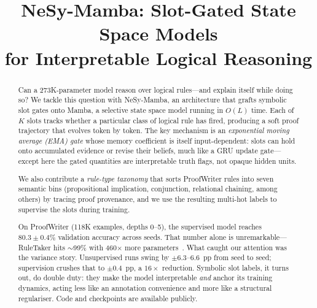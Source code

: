 \documentclass[conference]{IEEEtran}
\DeclareRobustCommand{\model}{NeSy-Mamba}
\begin{document}
\title{NeSy-Mamba: Slot-Gated State Space Models\\for Interpretable Logical Reasoning}

\author{
}

\maketitle

\begin{abstract}
Can a 273K-parameter model reason over logical rules---and explain
itself while doing so? We tackle this question with \model{}, an
architecture that grafts symbolic slot gates onto Mamba, a selective
state space model running in $O(L)$ time. Each of $K$ slots
tracks whether a particular class of logical rule has fired,
producing a soft proof trajectory that evolves token by token.
The key mechanism is an \emph{exponential moving average (EMA)
gate} whose memory coefficient is itself input-dependent: slots
can hold onto accumulated evidence or revise their beliefs,
much like a GRU update gate---except here the gated quantities
are interpretable truth flags, not opaque hidden units.

We also contribute a \emph{rule-type taxonomy} that sorts
ProofWriter rules into seven semantic bins (propositional
implication, conjunction, relational chaining, among others)
by tracing proof provenance, and we use the resulting
multi-hot labels to supervise the slots during training.

On ProofWriter (118K examples, depths 0--5), the supervised
model reaches $80.3 \pm 0.4\%$ validation accuracy across seeds.
That number alone is unremarkable---RuleTaker hits $\sim$99\%
with 460$\times$ more parameters~\cite{clark2020ruletaker}. What
caught our attention was the variance story. Unsupervised runs
swing by $\pm6.3$--$6.6$~pp from seed to seed; supervision
crushes that to $\pm0.4$~pp, a $16\times$ reduction. Symbolic
slot labels, it turns out, do double duty: they make the model
interpretable \emph{and} anchor its training dynamics, acting
less like an annotation convenience and more like a structural
regulariser. Code and checkpoints are available publicly.
\end{abstract}
\end{document}
